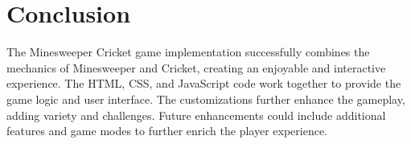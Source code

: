 \documentclass{article}
\begin{document}
\section{Conclusion}
The Minesweeper Cricket game implementation successfully combines the mechanics of Minesweeper and Cricket, creating an enjoyable and interactive experience. The HTML, CSS, and JavaScript code work together to provide the game logic and user interface. The customizations further enhance the gameplay, adding variety and challenges. Future enhancements could include additional features and game modes to further enrich the player experience.


\cite{WEBSITE:1}
\cite{WEBSITE:2}
\cite{WEBSITE:3}
\cite{WEBSITE:4}
\cite{WEBSITE:5}
\cite{WEBSITE:6}
\end{document}
